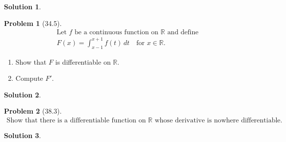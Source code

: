 \documentclass[12pt]{article}
\theoremstyle{definition} %
\newtheorem{solution}{Solution}
\newtheorem{problem}{Problem}
\theoremstyle{plain} %
\begin{document}
\begin{solution}
    
\end{solution}
\begin{problem}[34.5]
    \begin{align}
        \text{Let } f \text{ be a continuous function on } \mathbb{R} \text{ and define} \\
        F(x) = \int_{x-1}^{x+1} f(t) \, dt \quad \text{for } x \in \mathbb{R}.
    \end{align}
    \begin{enumerate}
        \item Show that \( F \) is differentiable on \( \mathbb{R} \).
        \item Compute \( F' \).
    \end{enumerate}
\end{problem}
\begin{solution}
    
\end{solution}
\begin{problem}[38.3]
    \begin{align}
        \text{Show that there is a differentiable function on } \mathbb{R} \text{ whose derivative is nowhere differentiable.}
    \end{align}
\end{problem}
\begin{solution}
    
\end{solution}
\end{document}
